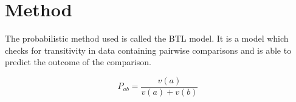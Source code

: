 \section*{Method}
\label{Method}
%
The probabilistic method used is called the BTL model. It is a model which checks for transitivity in data containing pairwise comparisons and is able to predict the outcome of the comparison.

\begin{equation}
P_{ab} =\frac{v(a)}{v(a)+v(b)} 
\end{equation}
